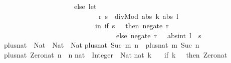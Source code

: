 \begin{isabellebody}
\begin{isamarkuptext}
\ \ \ \ \ \ \ \ \ \ \ \ \ \ \ \ \ \ \ \ else\ let\ {}\isanewline
\ \ \ \ \ \ \ \ \ \ \ \ \ \ \ \ \ \ \ \ \ \ \ \ \ \ \ {}r{}\ s{}\ {}\ divMod\ {}abs\ k{}\ {}abs\ l{}{}\isanewline
\ \ \ \ \ \ \ \ \ \ \ \ \ \ \ \ \ \ \ \ \ \ \ \ \ {}\ in\ {}if\ s\ {}{}\ {}\ then\ {}negate\ r{}\ {}{}\isanewline
\ \ \ \ \ \ \ \ \ \ \ \ \ \ \ \ \ \ \ \ \ \ \ \ \ \ \ \ \ \ \ \ else\ {}negate\ r\ {}\ {}{}\ abs{}int\ l\ {}\ s{}{}{}{}{}{}\isanewline
\isanewline
plus{}nat\ {}{}\ Nat\ {}{}\ Nat\ {}{}\ Nat{}\isanewline
plus{}nat\ {}Suc\ m{}\ n\ {}\ plus{}nat\ m\ {}Suc\ n{}{}\isanewline
plus{}nat\ Zero{}nat\ n\ {}\ n{}\isanewline
\isanewline
nat\ {}{}\ Integer\ {}{}\ Nat{}\isanewline
nat\ k\ {}\isanewline
\ \ {}if\ k\ {}{}\ {}\ then\ Zero{}nat\isanewline

\end{isamarkuptext}
\end{isabellebody}
